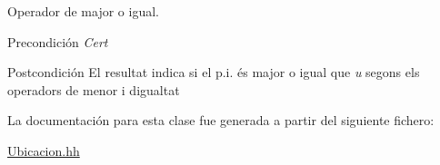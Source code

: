 Operador de major o igual. 

\begin{DoxyPrecond}{Precondición}
{\itshape Cert} 
\end{DoxyPrecond}
\begin{DoxyPostcond}{Postcondición}
El resultat indica si el p.\+i. és major o igual que {\itshape u} segons els operadors de menor i d\textquotesingle{}igualtat 
\end{DoxyPostcond}


La documentación para esta clase fue generada a partir del siguiente fichero\+:\begin{DoxyCompactItemize}
\item 
\hyperlink{_ubicacion_8hh}{Ubicacion.\+hh}\end{DoxyCompactItemize}
